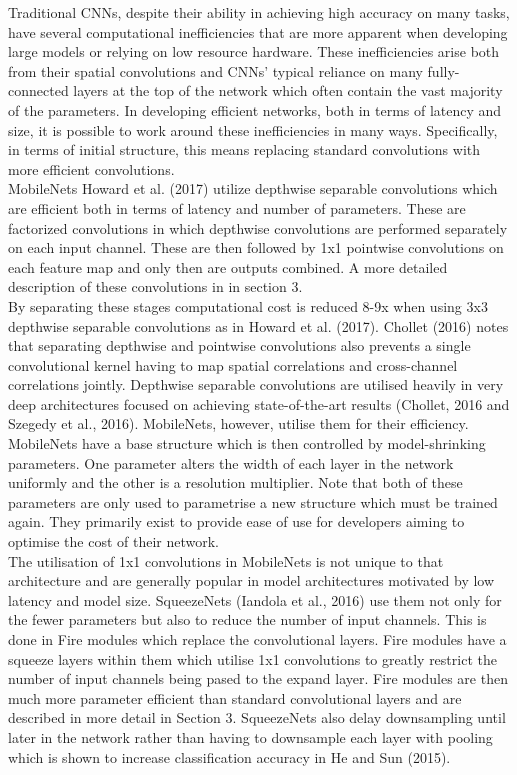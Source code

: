 \documentclass{article}
\begin{document}
Traditional CNNs, despite their ability in achieving high accuracy on many tasks, have several computational inefficiencies that are more apparent when developing large models or relying on low resource hardware. These inefficiencies  arise both from their spatial convolutions and CNNs' typical reliance on many fully-connected layers at the top of the network which often contain the vast majority of the parameters. In developing efficient networks, both in terms of latency and size, it is possible to work around these inefficiencies in many ways. Specifically, in terms of initial structure, this means replacing standard convolutions with more efficient convolutions.\\

MobileNets Howard et al. (2017) utilize depthwise separable convolutions which are efficient both in terms of latency  and number of parameters. These are factorized convolutions in which depthwise convolutions are performed separately on each input channel. These are then followed by 1x1 pointwise convolutions on each feature map and only then are outputs combined. A more detailed description of these convolutions in in section 3.\\ 

By separating these stages computational cost is reduced 8-9x when using 3x3 depthwise separable convolutions as in Howard et al. (2017). Chollet (2016) notes that separating depthwise and pointwise convolutions also prevents a single convolutional kernel having to map spatial correlations and cross-channel correlations jointly. Depthwise separable convolutions are utilised heavily in very deep architectures focused on achieving state-of-the-art results (Chollet, 2016 and Szegedy et al., 2016). MobileNets, however, utilise them for their efficiency. \\

MobileNets have a base structure which is then controlled by model-shrinking parameters. One parameter alters the width of each layer in the network uniformly and the other is a resolution multiplier. Note that both of these parameters are only used to parametrise a new structure which must be trained again. They primarily exist to provide ease of use for developers aiming to optimise the cost of their network.\\

The utilisation of 1x1 convolutions in MobileNets is not unique to that architecture and are generally popular in model architectures motivated by low latency and model size. SqueezeNets (Iandola et al., 2016) use them not only for the fewer parameters but also to reduce the number of input channels. This is done in Fire modules which replace the convolutional layers. Fire modules have a squeeze layers within them which utilise 1x1 convolutions to greatly restrict the number of input channels being pased to the expand layer. Fire modules are then much more parameter efficient than standard convolutional layers and are described in more detail in Section 3. SqueezeNets also delay downsampling until later in the network rather than having to downsample each layer with pooling which is shown to increase classification accuracy in He and Sun (2015).\\
\end{document}
